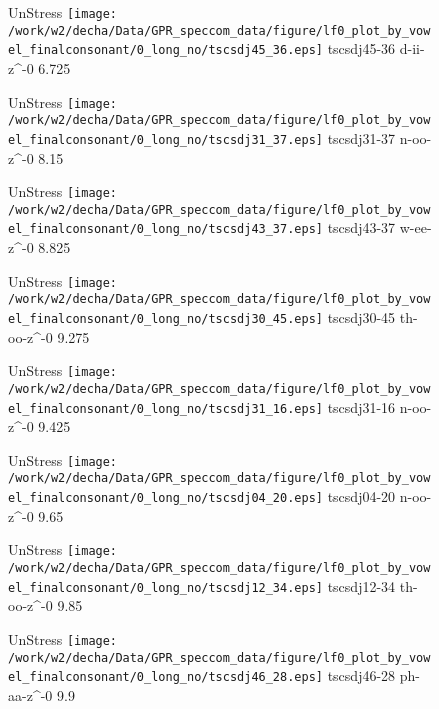 \documentclass{article}
\begin{document}
\begin{figure}[t]
\begin{minipage}[b]{.24\textwidth}
UnStress
\centering
\texttt{[image: /work/w2/decha/Data/GPR\_speccom\_data/figure/lf0\_plot\_by\_vowel\_finalconsonant/0\_long\_no/tscsdj45\_36.eps]}
tscsdj45-36 d-ii-z\textasciicircum-0 6.725
\end{minipage}
\begin{minipage}[b]{.24\textwidth}
UnStress
\centering
\texttt{[image: /work/w2/decha/Data/GPR\_speccom\_data/figure/lf0\_plot\_by\_vowel\_finalconsonant/0\_long\_no/tscsdj31\_37.eps]}
tscsdj31-37 n-oo-z\textasciicircum-0 8.15
\end{minipage}
\begin{minipage}[b]{.24\textwidth}
UnStress
\centering
\texttt{[image: /work/w2/decha/Data/GPR\_speccom\_data/figure/lf0\_plot\_by\_vowel\_finalconsonant/0\_long\_no/tscsdj43\_37.eps]}
tscsdj43-37 w-ee-z\textasciicircum-0 8.825
\end{minipage}
\begin{minipage}[b]{.24\textwidth}
UnStress
\centering
\texttt{[image: /work/w2/decha/Data/GPR\_speccom\_data/figure/lf0\_plot\_by\_vowel\_finalconsonant/0\_long\_no/tscsdj30\_45.eps]}
tscsdj30-45 th-oo-z\textasciicircum-0 9.275
\end{minipage}
\end{figure}

\begin{figure}[t]
\begin{minipage}[b]{.24\textwidth}
UnStress
\centering
\texttt{[image: /work/w2/decha/Data/GPR\_speccom\_data/figure/lf0\_plot\_by\_vowel\_finalconsonant/0\_long\_no/tscsdj31\_16.eps]}
tscsdj31-16 n-oo-z\textasciicircum-0 9.425
\end{minipage}
\begin{minipage}[b]{.24\textwidth}
UnStress
\centering
\texttt{[image: /work/w2/decha/Data/GPR\_speccom\_data/figure/lf0\_plot\_by\_vowel\_finalconsonant/0\_long\_no/tscsdj04\_20.eps]}
tscsdj04-20 n-oo-z\textasciicircum-0 9.65
\end{minipage}
\begin{minipage}[b]{.24\textwidth}
UnStress
\centering
\texttt{[image: /work/w2/decha/Data/GPR\_speccom\_data/figure/lf0\_plot\_by\_vowel\_finalconsonant/0\_long\_no/tscsdj12\_34.eps]}
tscsdj12-34 th-oo-z\textasciicircum-0 9.85
\end{minipage}
\begin{minipage}[b]{.24\textwidth}
UnStress
\centering
\texttt{[image: /work/w2/decha/Data/GPR\_speccom\_data/figure/lf0\_plot\_by\_vowel\_finalconsonant/0\_long\_no/tscsdj46\_28.eps]}
tscsdj46-28 ph-aa-z\textasciicircum-0 9.9
\end{minipage}
\end{figure}
\end{document}
